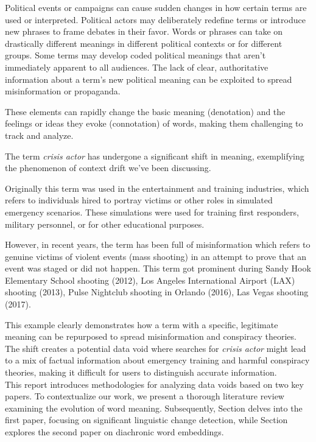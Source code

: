 Political events or campaigns can cause sudden changes in how certain terms are used or interpreted.
Political actors may deliberately redefine terms or introduce new phrases to frame debates in their favor.
Words or phrases can take on drastically different meanings in different political contexts or for different groups.
Some terms may develop coded political meanings that aren't immediately apparent to all audiences.
The lack of clear, authoritative information about a term's new political meaning can be exploited to spread misinformation or propaganda.

These elements can rapidly change the basic meaning (denotation) and the feelings or ideas they evoke (connotation) of words, making them challenging to track and analyze.

The term \emph{crisis actor} has undergone a significant shift in meaning,
exemplifying the phenomenon of context drift we've been discussing.

Originally this term was used in the entertainment and training industries,
which refers to individuals hired to portray victims or other roles in simulated emergency scenarios.
These simulations were used for training first responders, military personnel, or for other educational purposes.

However, in recent years, the term has been full of misinformation which refers to genuine victims of violent events (mass shooting) in an attempt to prove that an event was staged or did not happen.
This term got prominent during Sandy Hook Elementary School shooting (2012), Los Angeles International Airport (LAX) shooting (2013), Pulse Nightclub shooting in Orlando (2016), Las Vegas shooting (2017).

This example clearly demonstrates how a term with a specific, legitimate meaning can be repurposed to spread misinformation and conspiracy theories.
The shift creates a potential data void where searches for \emph{crisis actor} might lead to a mix of factual information about emergency training and harmful conspiracy theories,
making it difficult for users to distinguish accurate information.
\\
This report introduces methodologies for analyzing data voids based on two key papers.
To contextualize our work, we present a thorough literature review examining the evolution of word meaning.
Subsequently, Section  delves into the first paper, focusing on significant linguistic change detection,
while Section  explores the second paper on diachronic word embeddings.















